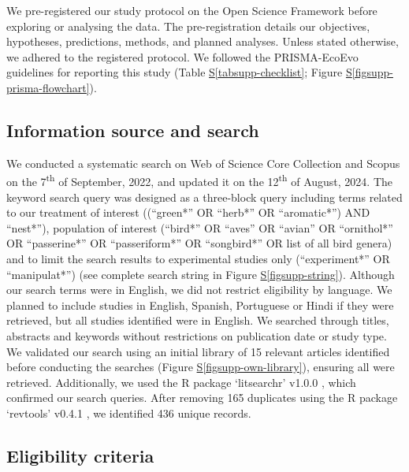 \documentclass[
  number,
  review,
  onecolumn]{elsarticle}
\newcommand*\quartofigsuppref[1]{Figure \hyperref[#1]{S\ref{#1}}}
\newcommand*\quartotabsuppref[1]{Table \hyperref[#1]{S\ref{#1}}}
\begin{document}
We pre-registered our study protocol on the Open Science Framework
\citep{dimri2024} before exploring or analysing the data. The
pre-registration details our objectives, hypotheses, predictions,
methods, and planned analyses. Unless stated otherwise, we adhered to
the registered protocol. We followed the PRISMA-EcoEvo guidelines
\citep{odea2021} for reporting this study
(\quartotabsuppref{tabsupp-checklist};
\quartofigsuppref{figsupp-prisma-flowchart}).

\subsection{Information source and
search}\label{information-source-and-search}

We conducted a systematic search on Web of Science Core Collection and
Scopus on the 7\textsuperscript{th} of September, 2022, and updated it
on the 12\textsuperscript{th} of August, 2024. The keyword search query
was designed as a three-block query including terms related to our
treatment of interest ((``green*'' OR ``herb*'' OR ``aromatic*'') AND
``nest*''), population of interest (``bird*'' OR ``aves'' OR ``avian''
OR ``ornithol*'' OR ``passerine*'' OR ``passeriform*'' OR ``songbird*''
OR list of all bird genera) and to limit the search results to
experimental studies only (``experiment*'' OR ``manipulat*'') (see
complete search string in \quartofigsuppref{figsupp-string}). Although
our search terms were in English, we did not restrict eligibility by
language. We planned to include studies in English, Spanish, Portuguese
or Hindi if they were retrieved, but all studies identified were in
English. We searched through titles, abstracts and keywords without
restrictions on publication date or study type. We validated our search
using an initial library of 15 relevant articles identified before
conducting the searches (\quartofigsuppref{figsupp-own-library}),
ensuring all were retrieved. Additionally, we used the R package
`litsearchr' v1.0.0 \citep{grames2019}, which confirmed our search
queries. After removing 165 duplicates using the R package `revtools'
v0.4.1 \citep{westgate2019}, we identified 436 unique records.

\subsection{Eligibility criteria}\label{eligibility-criteria}
\end{document}
